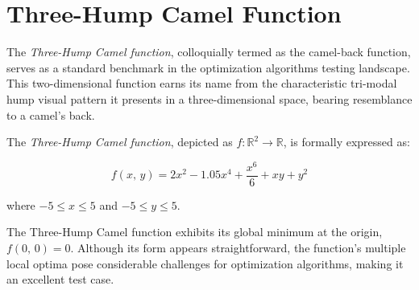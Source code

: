\section{Three-Hump Camel Function}
\label{sec:app:test:three-hump}
  The \emph{Three-Hump Camel function}, colloquially termed as the camel-back 
  function, serves as a standard benchmark in the optimization algorithms
  testing landscape.
  This two-dimensional function earns its name from the characteristic tri-modal
  hump visual pattern it presents in a three-dimensional space, bearing
  resemblance to a camel's back.

  \begin{definition}
    \label{def:app:test:three-hump}
    The \emph{Three-Hump Camel function}, depicted as \(f: \mathbb{R}^2 \rightarrow 
    \mathbb{R}\), is formally expressed as:

    \begin{equation}
      \label{eq:app:test:three-hump}
      f(x,\,y) = 2x^2 - 1.05x^4 + \frac{x^6}{6} + xy + y^2
    \end{equation}
    
    where \(-5 \leq x \leq 5\) and \(-5 \leq y \leq 5\).
  \end{definition}

  The Three-Hump Camel function exhibits its global minimum at the origin,
  \(f(0,\, 0) = 0\).
  Although its form appears straightforward, the function's multiple local
  optima pose considerable challenges for optimization algorithms, making it an
  excellent test case.

